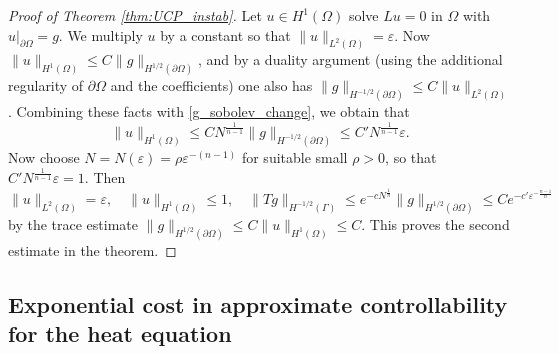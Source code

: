 \documentclass[12pt,twoside]{amsart}
\numberwithin{equation}{section}
\renewcommand{\leq}{\leqslant}
\newcommand {\p} {\partial}
\newcommand{\norm}[1]{\lVert #1 \rVert}         %
\newcommand{\eps}{\varepsilon}
\begin{document}
\begin{proof}[Proof of Theorem \ref{thm:UCP_instab}]
Let $u \in H^1(\Omega)$ solve $Lu = 0$ in $\Omega$ with $u|_{\p \Omega} = g$. We multiply $u$ by a constant so that $\norm{u}_{L^2(\Omega)} = \eps$. Now $\norm{u}_{H^1(\Omega)} \leq C \norm{g}_{H^{1/2}(\p \Omega)}$, and by a duality argument (using the additional regularity of $\p \Omega$ and the coefficients) one also has $\norm{g}_{H^{-1/2}(\p \Omega)} \leq C \norm{u}_{L^2(\Omega)}$. Combining these facts with \eqref{g_sobolev_change}, we obtain that 
\[
\norm{u}_{H^1(\Omega)} \leq C N^{\frac{1}{n-1}} \norm{g}_{H^{-1/2}(\p \Omega)} \leq C' N^{\frac{1}{n-1}} \eps.
\]
Now choose $N = N(\eps) = \rho \eps^{-(n-1)}$ for suitable small $\rho > 0$, so that $C' N^{\frac{1}{n-1}} \eps = 1$. Then 
\[
\norm{u}_{L^2(\Omega)} = \eps, \quad \norm{u}_{H^1(\Omega)} \leq 1, \quad \norm{Tg}_{H^{-1/2}(\Gamma)} \leq e^{-c N^{\frac{1}{n}}} \norm{g}_{H^{1/2}(\p \Omega)} \leq C e^{-c' \eps^{-\frac{n-1}{n}}}
\]
by the trace estimate $\norm{g}_{H^{1/2}(\p \Omega)} \leq C \norm{u}_{H^1(\Omega)} \leq C$. This proves the second estimate in the theorem.
\end{proof}




\subsection{Exponential cost in approximate controllability for the heat equation}
\label{sec:control}
\end{document}

